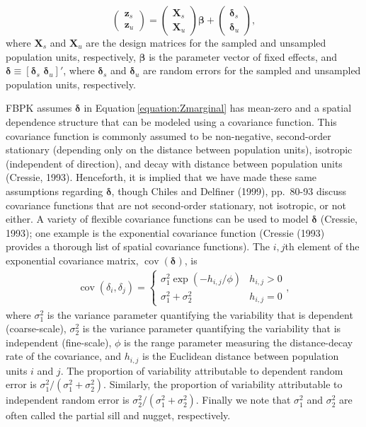\documentclass[]{elsarticle} %
\begin{document}
\begin{equation}
\begin{pmatrix} \label{equation:Zmarginal}
    \mathbf{z}_s      \\
    \mathbf{z}_u
\end{pmatrix}
=
\begin{pmatrix}
  \mathbf{X}_s    \\
  \mathbf{X}_u
\end{pmatrix}
\bm{\beta} +
\begin{pmatrix}
\bm{\delta}_s    \\
\bm{\delta}_u
\end{pmatrix},
\end{equation} where \(\mathbf{X}_s\) and \(\mathbf{X}_u\) are the
design matrices for the sampled and unsampled population units,
respectively, \(\bm{\beta}\) is the parameter vector of fixed effects,
and \(\bm{\delta} \equiv [\bm{\delta}_s \,\, \bm{\delta}_u]'\), where
\(\bm{\delta}_s\) and \(\bm{\delta}_u\) are random errors for the
sampled and unsampled population units, respectively.

FBPK assumes \(\bm{\delta}\) in Equation\(~\)\ref{equation:Zmarginal}
has mean-zero and a spatial dependence structure that can be modeled
using a covariance function. This covariance function is commonly
assumed to be non-negative, second-order stationary (depending only on
the distance between population units), isotropic (independent of
direction), and decay with distance between population units (Cressie,
1993). Henceforth, it is implied that we have made these same
assumptions regarding \(\bm{\delta}\), though Chiles and Delfiner
(1999), pp.~80-93 discuss covariance functions that are not second-order
stationary, not isotropic, or not either. A variety of flexible
covariance functions can be used to model \(\bm{\delta}\) (Cressie,
1993); one example is the exponential covariance function (Cressie
(1993) provides a thorough list of spatial covariance functions). The
\(i,j\)th element of the exponential covariance matrix,
\(\mathop{\mathrm{{cov}}}(\bm{\delta})\), is \mbox{}
\begin{align}\label{equation:expcov}
\mathop{\mathrm{{cov}}}(\delta_i, \delta_j) = 
\begin{cases} 
\sigma^2_{1}\exp(-h_{i,j}/\phi) & h_{i,j} > 0 \\
\sigma^2_{1} + \sigma^2_2 & h_{i,j} = 0
\end{cases}
,
\end{align} where \(\sigma^2_{1}\) is the variance parameter quantifying
the variability that is dependent (coarse-scale), \(\sigma^2_{2}\) is
the variance parameter quantifying the variability that is independent
(fine-scale), \(\phi\) is the range parameter measuring the
distance-decay rate of the covariance, and \(h_{i,j}\) is the Euclidean
distance between population units \(i\) and \(j\). The proportion of
variability attributable to dependent random error is
\(\sigma^2_{1} / (\sigma^2_{1} + \sigma^2_{2})\). Similarly, the
proportion of variability attributable to independent random error is
\(\sigma^2_{2} / (\sigma^2_{1} + \sigma^2_{2})\). Finally we note that
\(\sigma^2_{1}\) and \(\sigma^2_{2}\) are often called the partial sill
and nugget, respectively.
\end{document}
